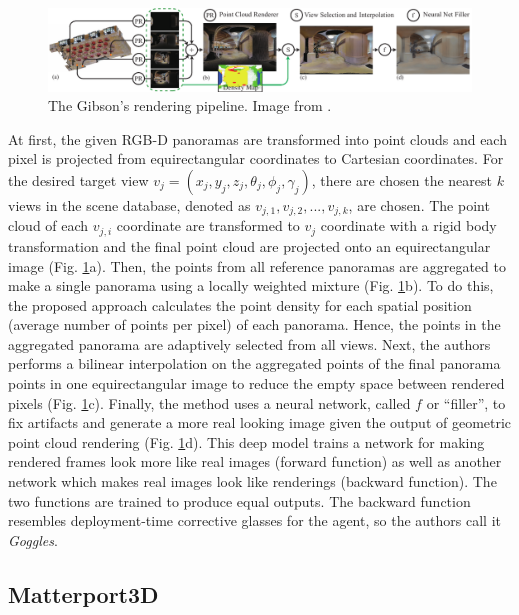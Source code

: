 \begin{figure}[h!]
	\centering
	\includegraphics[width=\linewidth]{images/gibson_rendering_pipeline.pdf}
	\caption{The Gibson's rendering pipeline. Image from \cite{gibson}.}
	\label{fig:gibsonrenderingpipeline}
\end{figure}
At first, the given RGB-D panoramas are transformed into point clouds and each pixel is projected from equirectangular coordinates to Cartesian coordinates. For the desired target view $v_j =
(x_j , y_j , z_j , \theta_j, \phi_j, \gamma_j )$, there are chosen the nearest $k$ views in the
scene database, denoted as $v_{j,1}, v_{j,2}, ..., v_{j,k}$, are chosen. The point cloud of each $v_{j,i}$ coordinate are transformed to $v_j$ coordinate with a rigid body transformation and the final point cloud are projected onto an equirectangular image (Fig. \ref{fig:gibsonrenderingpipeline}a). Then, the points from all reference panoramas are aggregated to make a single panorama using a locally weighted mixture (Fig. \ref{fig:gibsonrenderingpipeline}b). To do this, the proposed approach calculates the point density for each spatial position (average number of points per pixel) of each panorama. Hence, the points in the aggregated panorama are adaptively selected from all views. Next, the authors performs a bilinear interpolation on the aggregated points of the final panorama
points in one equirectangular image to reduce the empty space between rendered pixels (Fig. \ref{fig:gibsonrenderingpipeline}c). Finally, the method uses a neural network, called $f$ or ``filler'', to fix artifacts and generate a more real looking image given the output of geometric point cloud rendering (Fig. \ref{fig:gibsonrenderingpipeline}d). This deep model trains a network for making rendered frames look more like real images (forward function) as well as another network which makes real images look like renderings (backward function). The two functions are trained to produce equal outputs. The backward function resembles deployment-time corrective
glasses for the agent, so the authors call it \textit{Goggles}.

\subsection{Matterport3D}






